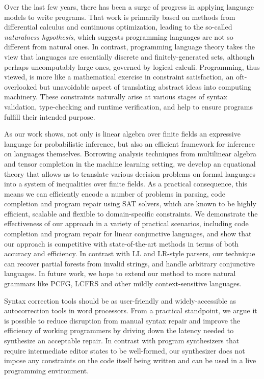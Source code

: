 \documentclass[sigplan,review,anonymous,acmsmall]{acmart}\settopmatter{printfolios=false,printccs=false,printacmref=false}
\begin{document}
  Over the last few years, there has been a surge of progress in applying language models to write programs. That work is primarily based on methods from differential calculus and continuous optimization, leading to the so-called \textit{naturalness hypothesis}, which suggests programming languages are not so different from natural ones. In contrast, programming language theory takes the view that languages are essentially discrete and finitely-generated sets, although perhaps uncomputably large ones, governed by logical calculi. Programming, thus viewed, is more like a mathematical exercise in constraint satisfaction, an oft-overlooked but unavoidable aspect of translating abstract ideas into computing machinery. These constraints naturally arise at various stages of syntax validation, type-checking and runtime verification, and help to ensure programs fulfill their intended purpose.

  As our work shows, not only is linear algebra over finite fields an expressive language for probabilistic inference, but also an efficient framework for inference on languages themselves. Borrowing analysis techniques from multilinear algebra and tensor completion in the machine learning setting, we develop an equational theory that allows us to translate various decision problems on formal languages into a system of inequalities over finite fields. As a practical consequence, this means we can efficiently encode a number of problems in parsing, code completion and program repair using SAT solvers, which are known to be highly efficient, scalable and flexible to domain-specific constraints. We demonstrate the effectiveness of our approach in a variety of practical scenarios, including code completion and program repair for linear conjunctive languages, and show that our approach is competitive with state-of-the-art methods in terms of both accuracy and efficiency. In contrast with LL and LR-style parsers, our technique can recover partial forests from invalid strings, and handle arbitrary conjunctive languages. In future work, we hope to extend our method to more natural grammars like PCFG, LCFRS and other mildly context-sensitive languages.

  Syntax correction tools should be as user-friendly and widely-accessible as autocorrection tools in word processors. From a practical standpoint, we argue it is possible to reduce disruption from manual syntax repair and improve the efficiency of working programmers by driving down the latency needed to synthesize an acceptable repair. In contrast with program synthesizers that require intermediate editor states to be well-formed, our synthesizer does not impose any constraints on the code itself being written and can be used in a live programming environment.
\end{document}
